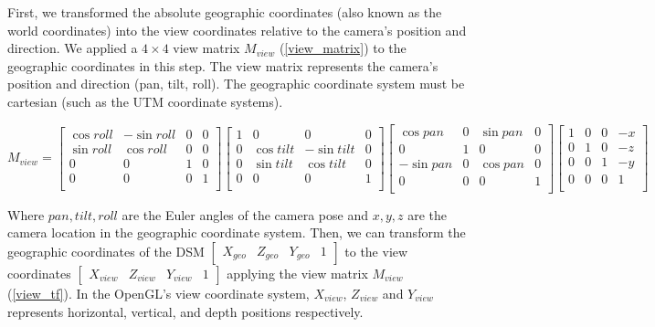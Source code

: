 \documentclass{article}
\begin{document}
First, we transformed the absolute geographic coordinates (also known as the world coordinates) into the view coordinates relative to the camera's position and direction. We applied a \(4 \times 4\) view matrix \(M_{view}\) (\ref{view_matrix}) to the geographic coordinates in this step. The view matrix represents the camera's position and direction (pan, tilt, roll). The geographic coordinate system must be cartesian (such as the UTM coordinate systems).

\begin{equation}
\label{view_matrix}
  M_{view} = 
  \begin{bmatrix}
    \cos roll & -\sin roll & 0 & 0 \\
    \sin roll & \cos roll & 0 & 0 \\
    0 & 0 & 1 & 0 \\
    0 & 0 & 0 & 1 \\
  \end{bmatrix}
  \begin{bmatrix}
    1 & 0 & 0 & 0 \\
    0 & \cos tilt & -\sin tilt & 0 \\
    0 & \sin tilt & \cos tilt & 0 \\
    0 & 0 & 0 & 1 \\
  \end{bmatrix}
  \begin{bmatrix}
    \cos pan & 0 & \sin pan & 0 \\
    0 & 1 & 0 & 0 \\
    -\sin pan & 0 & \cos pan & 0 \\
    0 & 0 & 0 & 1 \\
  \end{bmatrix}
  \begin{bmatrix}
    1 & 0 & 0 & -x \\
    0 & 1 & 0 & -z \\
    0 & 0 & 1 & -y \\
    0& 0 & 0 & 1 \\
  \end{bmatrix}
\end{equation}

Where \(pan, tilt, roll\) are the Euler angles of the camera pose and \(x, y, z\) are the camera location in the geographic coordinate system. Then, we can transform the geographic coordinates of the DSM \(\begin{bmatrix} X_{geo} & Z_{geo} & Y_{geo} & 1 \end{bmatrix}\) to the view coordinates \(\begin{bmatrix} X_{view} & Z_{view} & Y_{view} & 1 \end{bmatrix}\) applying the view matrix \(M_{view}\) (\ref{view_tf}). In the OpenGL's view coordinate system, \(X_{view}\), \(Z_{view}\) and \(Y_{view}\) represents horizontal, vertical, and depth positions respectively.
\end{document}
